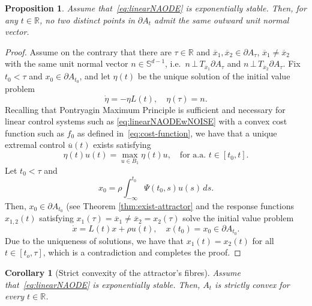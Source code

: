 \documentclass[reqno]{amsart}
\newtheorem{prop}[thm]{Proposition}
\newtheorem{cor}[thm]{Corollary}
\theoremstyle{definition}
\numberwithin{equation}{section}
\newcommand{\R}{\mathbb{R}}
\newcommand{\U}{\mathcal{U}}
\begin{document}
\begin{prop}%
    Assume that~\eqref{eq:linearNAODE} is exponentially stable. Then, for any $t\in\R$, no two distinct points in $\partial A_t$ admit the same outward unit normal vector.
\end{prop}
\begin{proof}
    Assume on the contrary that there are $\tau\in \R$ and  $\overline x_1, \overline x_2\in \partial A_\tau $, $\overline x_1\neq \overline x_2$ with the same unit normal vector $n\in\mathbb S^{d-1}$, i.e.~$n\, \bot\, T_{\overline x_1}\partial A_\tau$ and $n\, \bot\, T_{\overline x_2} \partial A_\tau$. Fix $t_0<\tau$ and $x_0\in\partial A_{t_0}$, and let $\eta(t)$ be the unique solution of the initial value problem
    \[
    \dot \eta =-\eta L(t), \quad \eta(\tau)=n.
    \]
    Recalling that Pontryagin Maximum Principle is sufficient and necessary for linear control systems such as \eqref{eq:linearNAODEwNOISE} with a convex cost function such as $f_0$ as defined in~\eqref{eq:cost-function}, we have that a unique extremal control $\overline u(t)$ exists satisfying
    \[
    \eta(t)u(t)=\max_{u\in B_1}\eta(t)u, \quad \text{for a.a. }t\in[t_0,t].
    \]
    Let $t_0<\tau$ and 
    \[
    x_0=\rho\int_{-\infty}^{t_0} \Psi(t_0,s)u(s)\,ds.
    \]
    Then, $x_0\in \partial A_{t_0}$ (see Theorem \ref{thm:exist-attractor} and the response functions $x_{1,2}(t)$ satisfying $x_1(\tau)=\overline x_1\neq\overline x_2=x_2(\tau)$ solve the initial value problem
    \[
    \dot x =L(t)x+\rho u(t),\quad x(t_0)=x_0\in\partial A_{t_0}.
    \]
    Due to the uniqueness of solutions, we have that $x_1(t)=x_2(t)$ for all $t\in[t_o,\tau]$, which is a contradiction and completes the proof.  
\end{proof}

\begin{cor}[Strict convexity of the attractor's fibres]\label{cor:linear-strictly-convex}
    Assume that~\eqref{eq:linearNAODE} is exponentially stable. Then, $A_t$ is strictly convex for every $t\in\R$.
\end{cor}


\end{document}
